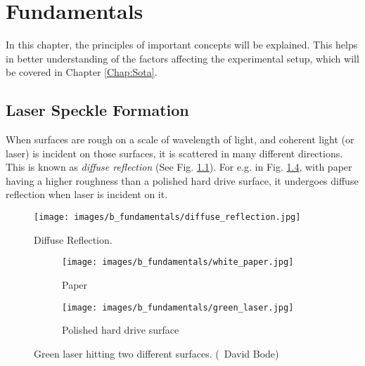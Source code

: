 \chapter{Fundamentals}\label{Chap:Fundamentals}

In this chapter, the principles of important concepts will be explained. This helps in better understanding of the factors affecting the experimental setup, which will be covered in Chapter \ref{Chap:Sota}.

    \section*{Laser Speckle Formation}

    When surfaces are rough on a scale of wavelength of light, and coherent light (or laser) is incident on those surfaces, it is scattered in many different directions. This is known as \emph{diffuse reflection} (See Fig. \ref{fig:diffuse_reflection}). For e.g. in Fig. \ref{fig:green_laser}, with paper having a higher roughness than a polished hard drive surface, it undergoes diffuse reflection when laser is incident on it.

    \begin{figure}[h]
        \centering
        \texttt{[image: images/b\_fundamentals/diffuse\_reflection.jpg]}
        \caption{Diffuse Reflection. \cite{img_diffuse}}
        \label{fig:diffuse_reflection}
    \end{figure}
    
    \begin{figure}[h]
        \begin{subfigure}{0.5\textwidth}
            \centering
            \texttt{[image: images/b\_fundamentals/white\_paper.jpg]}
            \caption{Paper}
            \label{subfig:white_paper.jpg}
        \end{subfigure}
        \begin{subfigure}{0.5\textwidth}
            \centering
            \texttt{[image: images/b\_fundamentals/green\_laser.jpg]}
            \caption{Polished hard drive surface}
            \label{subfig:hard_drive.jpg}
        \end{subfigure}
        \caption{Green laser hitting two different surfaces. (\textcopyright \ David Bode) \cite{img_green_laser}}
        \label{fig:green_laser}
    \end{figure}
    
    \clearpage

